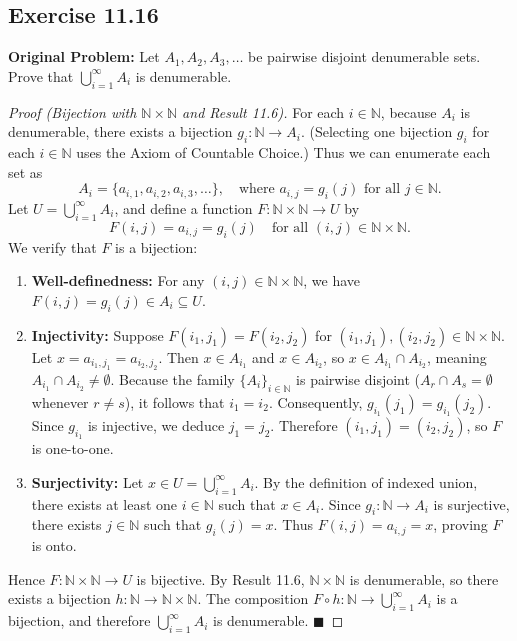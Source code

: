\documentclass[11pt, letterpaper]{article}
\theoremstyle{definition}
\theoremstyle{remark}
\begin{document}
\subsection*{Exercise 11.16}
\textbf{Original Problem:} Let $A_1, A_2, A_3, \dots$ be pairwise disjoint denumerable sets. Prove that $\bigcup_{i=1}^\infty A_i$ is denumerable.

\begin{proof}[Proof (Bijection with $\mathbb{N} \times \mathbb{N}$ and Result 11.6)]
For each $i \in \mathbb{N}$, because $A_i$ is denumerable, there exists a bijection $g_i : \mathbb{N} \to A_i$. (Selecting one bijection $g_i$ for each $i \in \mathbb{N}$ uses the Axiom of Countable Choice.) Thus we can enumerate each set as
\[
A_i = \{a_{i,1}, a_{i,2}, a_{i,3}, \dots\}, \quad \text{where } a_{i,j} = g_i(j) \text{ for all } j \in \mathbb{N}.
\]
Let $U = \bigcup_{i=1}^\infty A_i$, and define a function $F : \mathbb{N} \times \mathbb{N} \to U$ by
\[
F(i, j) = a_{i,j} = g_i(j) \quad \text{for all } (i, j) \in \mathbb{N} \times \mathbb{N}.
\]
We verify that $F$ is a bijection:
\begin{enumerate}[label=(\arabic*)]
    \item \textbf{Well-definedness:} For any $(i, j) \in \mathbb{N} \times \mathbb{N}$, we have $F(i, j) = g_i(j) \in A_i \subseteq U$.
    
    \item \textbf{Injectivity:} Suppose $F(i_1, j_1) = F(i_2, j_2)$ for $(i_1, j_1), (i_2, j_2) \in \mathbb{N} \times \mathbb{N}$. Let $x = a_{i_1, j_1} = a_{i_2, j_2}$. Then $x \in A_{i_1}$ and $x \in A_{i_2}$, so $x \in A_{i_1} \cap A_{i_2}$, meaning $A_{i_1} \cap A_{i_2} \neq \emptyset$. Because the family $\{A_i\}_{i \in \mathbb{N}}$ is pairwise disjoint ($A_r \cap A_s = \emptyset$ whenever $r \neq s$), it follows that $i_1 = i_2$. Consequently, $g_{i_1}(j_1) = g_{i_1}(j_2)$. Since $g_{i_1}$ is injective, we deduce $j_1 = j_2$. Therefore $(i_1, j_1) = (i_2, j_2)$, so $F$ is one-to-one.
    
    \item \textbf{Surjectivity:} Let $x \in U = \bigcup_{i=1}^\infty A_i$. By the definition of indexed union, there exists at least one $i \in \mathbb{N}$ such that $x \in A_i$. Since $g_i : \mathbb{N} \to A_i$ is surjective, there exists $j \in \mathbb{N}$ such that $g_i(j) = x$. Thus $F(i, j) = a_{i,j} = x$, proving $F$ is onto.
\end{enumerate}
Hence $F : \mathbb{N} \times \mathbb{N} \to U$ is bijective. By Result 11.6, $\mathbb{N} \times \mathbb{N}$ is denumerable, so there exists a bijection $h : \mathbb{N} \to \mathbb{N} \times \mathbb{N}$. The composition $F \circ h : \mathbb{N} \to \bigcup_{i=1}^\infty A_i$ is a bijection, and therefore $\bigcup_{i=1}^\infty A_i$ is denumerable. $\blacksquare$
\end{proof}
\end{document}
